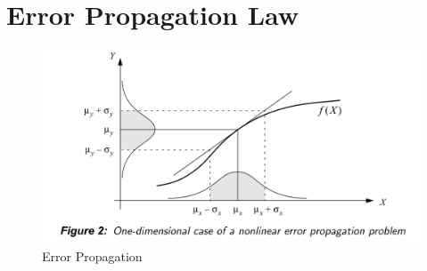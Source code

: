 \documentclass[a4paper]{report}
\numberwithin{figure}{section}
\begin{document}
\section{Error Propagation Law}

\begin{figure}[H]
	\centering
	\includegraphics[width=\linewidth,natwidth=640,natheight=640]
	{fig/ref_imgs/error_propagation.png}
	\caption{Error Propagation}
  \label{fig:error_propagation}
\end{figure}
\end{document}
